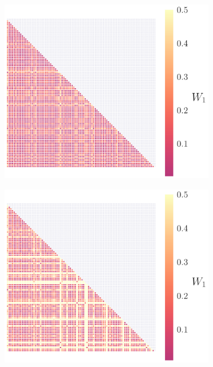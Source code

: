 \documentclass[fleqn,usenatbib,useAMS]{mnras}
\providecommand{\DIFadd}[1]{{\protect\color{blue}\uwave{#1}}} %
\providecommand{\DIFaddFL}[1]{\DIFadd{#1}} %
\begin{document}
\begin{figure}
	\medskip
	\begin{subfigure}[b]{0.3\textwidth}
		\includegraphics[width=\textwidth]{images/WD_4}
		\caption{\DIFaddFL{$\delta$}}
	\end{subfigure}
	\hfill	
	\begin{subfigure}[b]{0.3\textwidth}
		\includegraphics[width=\textwidth]{images/WD_5}
		\caption{\DIFaddFL{$\alpha$}}
	\end{subfigure}
	\hfill	
	\begin{subfigure}[b]{0.3\textwidth}

\end{subfigure}
\end{figure}
\end{document}
